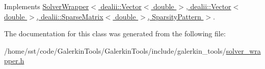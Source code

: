 Implements \hyperlink{class_solver_wrapper_a509594953f388e594bfdde5b927ece35}{Solver\+Wrapper$<$ dealii\+::\+Vector$<$ double $>$, dealii\+::\+Vector$<$ double $>$, dealii\+::\+Sparse\+Matrix$<$ double $>$, Sparsity\+Pattern $>$}.



The documentation for this class was generated from the following file\+:\begin{DoxyCompactItemize}
\item 
/home/sst/code/\+Galerkin\+Tools/\+Galerkin\+Tools/include/galerkin\+\_\+tools/\hyperlink{solver__wrapper_8h}{solver\+\_\+wrapper.\+h}\end{DoxyCompactItemize}
